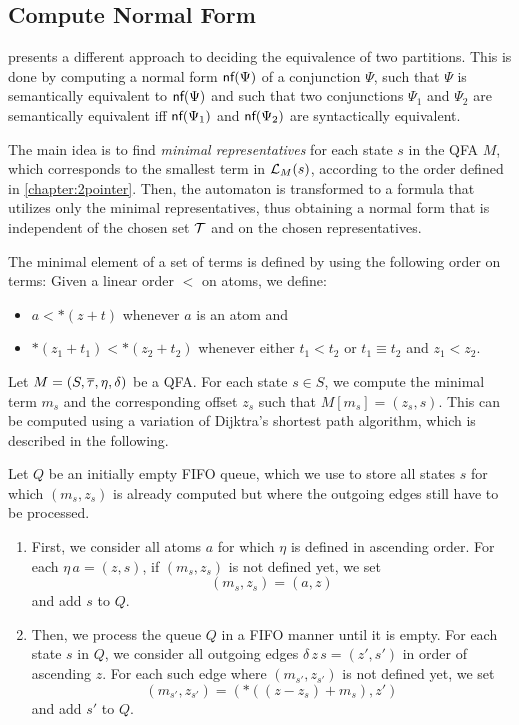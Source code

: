\subsection{Compute Normal Form}

\textcite{2pointer} presents a different approach to deciding the equivalence of two partitions.
This is done by computing a normal form $\textsf{nf}(\Psi)$ of a conjunction $\Psi$, such that $\Psi$ is semantically equivalent to $\textsf{nf}(\Psi)$ and such that two conjunctions $\Psi_1$ and $\Psi_2$ are semantically equivalent iff $\textsf{nf}(\Psi_1)$ and $\textsf{nf}(\Psi_2)$ are syntactically equivalent.

The main idea is to find \emph{minimal representatives} for each state $s$ in the QFA $M$,
which corresponds to the smallest term in $\mathcal{L}_{M}(s)$, according to the order defined in \cref{chapter:2pointer}.
Then, the automaton is transformed to a formula that utilizes only the minimal representatives, thus obtaining a normal form that is independent of the chosen set $\mathcal{T}$ and on the chosen representatives.

The minimal element of a set of terms is defined by using the following order on terms:
Given a linear order $<$ on atoms, we define:
\begin{itemize}
  \item $a < *(z+t)$ whenever $a$ is an atom and
  \item $*(z_1 + t_1) < *(z_2 + t_2)$ whenever either $t_1 < t_2$ or $t_1 \equiv t_2$ and $z_1 < z_2$.
\end{itemize}



Let $M = (S, \overline{\tau}, \eta, \delta)$ be a QFA.\@
For each state $s \in S$, we compute the minimal term $m_s$ and the corresponding offset $z_s$ such that $M[m_s] = (z_s,s)$.
This can be computed using a variation of Dijktra's shortest path algorithm, which is described in the following.

Let $Q$ be an initially empty FIFO queue, which we use to store all states $s$ for which $(m_s,z_s)$ is already computed but where the outgoing edges still have to be processed.

\begin{enumerate}
    \item
          First, we consider all atoms $a$ for which $\eta$ is defined in ascending order. For each $\eta\,a = (z,s)$, if $(m_s,z_s)$ is not defined yet, we set
          \[
              (m_s,z_s) = (a,z)
          \]
          and add $s$ to $Q$.
    \item
          Then, we process the queue $Q$ in a FIFO manner until it is empty.
          For each state $s$ in $Q$, we consider all outgoing edges $\delta\,z\,s = (z',s')$ in order of ascending $z$.
          For each such edge where $(m_{s'},z_{s'})$ is not defined yet, we set
          \[
              (m_{s'},z_{s'}) = (*((z-z_s)+m_s),z')
          \]
          and add $s'$ to $Q$.
\end{enumerate}

